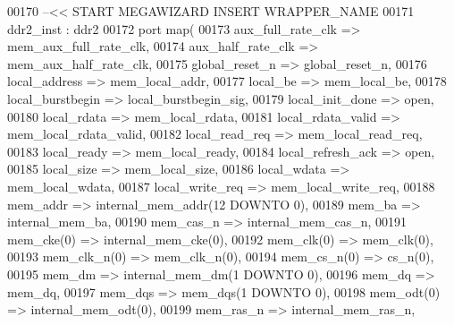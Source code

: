 \begin{DoxyCode}
{00170 \textcolor{keyword}{  --<< START MEGAWIZARD INSERT WRAPPER\_NAME}
00171   ddr2\_inst : ddr2
00172     \textcolor{keywordflow}{port} \textcolor{keywordflow}{map}(
00173             aux_full_rate_clk => mem_aux_full_rate_clk,
00174             aux_half_rate_clk => mem_aux_half_rate_clk,
00175             global_reset_n => global_reset_n,
00176             local_address => mem_local_addr,
00177             local_be => mem_local_be,
00178             local_burstbegin => local_burstbegin_sig,
00179             local_init_done => \textcolor{keywordflow}{open},
00180             local_rdata => mem_local_rdata,
00181             local_rdata_valid => mem_local_rdata_valid,
00182             local_read_req => mem_local_read_req,
00183             local_ready => mem_local_ready,
00184             local_refresh_ack => \textcolor{keywordflow}{open},
00185             local_size => mem_local_size,
00186             local_wdata => mem_local_wdata,
00187             local_write_req => mem_local_write_req,
00188             mem_addr => internal_mem_addr\textcolor{vhdlchar}{(}\textcolor{vhdllogic}{12} \textcolor{keywordflow}{DOWNTO} \textcolor{vhdllogic}{0}\textcolor{vhdlchar}{)},
00189             mem_ba => internal_mem_ba,
00190             mem_cas_n => internal_mem_cas_n,
00191             mem_cke\textcolor{vhdlchar}{(}\textcolor{vhdllogic}{0}\textcolor{vhdlchar}{)} => internal_mem_cke\textcolor{vhdlchar}{(}\textcolor{vhdllogic}{0}\textcolor{vhdlchar}{)},
00192             mem_clk\textcolor{vhdlchar}{(}\textcolor{vhdllogic}{0}\textcolor{vhdlchar}{)} => mem_clk\textcolor{vhdlchar}{(}\textcolor{vhdllogic}{0}\textcolor{vhdlchar}{)},
00193             mem_clk_n\textcolor{vhdlchar}{(}\textcolor{vhdllogic}{0}\textcolor{vhdlchar}{)} => mem_clk_n\textcolor{vhdlchar}{(}\textcolor{vhdllogic}{0}\textcolor{vhdlchar}{)},
00194             mem_cs_n\textcolor{vhdlchar}{(}\textcolor{vhdllogic}{0}\textcolor{vhdlchar}{)} => cs_n\textcolor{vhdlchar}{(}\textcolor{vhdllogic}{0}\textcolor{vhdlchar}{)},
00195             mem_dm => internal_mem_dm\textcolor{vhdlchar}{(}\textcolor{vhdllogic}{1} \textcolor{keywordflow}{DOWNTO} \textcolor{vhdllogic}{0}\textcolor{vhdlchar}{)},
00196             mem_dq => mem_dq,
00197             mem_dqs => mem_dqs\textcolor{vhdlchar}{(}\textcolor{vhdllogic}{1} \textcolor{keywordflow}{DOWNTO} \textcolor{vhdllogic}{0}\textcolor{vhdlchar}{)},
00198             mem_odt\textcolor{vhdlchar}{(}\textcolor{vhdllogic}{0}\textcolor{vhdlchar}{)} => internal_mem_odt\textcolor{vhdlchar}{(}\textcolor{vhdllogic}{0}\textcolor{vhdlchar}{)},
00199             mem_ras_n => internal_mem_ras_n,
}
\end{DoxyCode}
